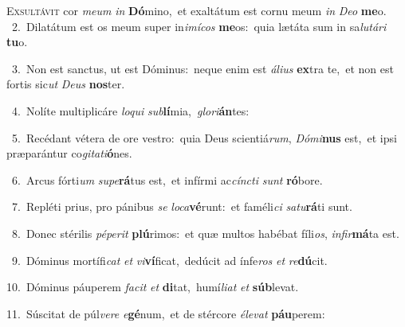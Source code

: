 \lettrine{\initial\textcolor{\initialcolor}{E}}{xsultávit} cor \textit{me}\-\textit{um} \textit{in} \textbf{Dó}\-mino,~\star et exaltátum est cornu meum \textit{in} \textit{De}\-\textit{o} \textbf{me}\-o.\\
{\numbfont\textcolor{\numbcolor}{~2.}}~Dilatátum est os meum super in\-\textit{i}\-\textit{mí}\textit{cos} \textbf{me}\-os:~\star quia lætáta sum in sa\-\textit{lu}\-\textit{tá}\textit{ri} \textbf{tu}\-o.\par
{\numbfont\textcolor{\numbcolor}{~3.}}~Non est sanctus, ut est Dóminus:~\dagger neque enim est \textit{á}\-\textit{li}\textit{us} \textbf{ex}\-tra te,~\star et non est fortis sic\textit{ut} \textit{De}\-\textit{us} \textbf{nos}\-ter.\par
{\numbfont\textcolor{\numbcolor}{~4.}}~Nolíte multiplicáre \textit{lo}\-\textit{qui} \textit{sub}\-\textbf{lí}mia,~\star \textit{glo}\-\textit{ri}\textbf{án}tes:\par
{\numbfont\textcolor{\numbcolor}{~5.}}~Recédant vétera de ore vestro:~\dagger quia Deus scientiá\-\textit{rum}\-, \textit{Dó}\-\textit{mi}\textbf{nus} est,~\star et ipsi præparántur co\-\textit{gi}\-\textit{ta}\textit{ti}\textbf{ó}nes.\par
{\numbfont\textcolor{\numbcolor}{~6.}}~Arcus fórti\textit{um} \textit{su}\-\textit{pe}\textbf{rá}tus est,~\star et infírmi ac\-\textit{cínc}\-\textit{ti} \textit{sunt} \textbf{ró}\-bore.\par
{\numbfont\textcolor{\numbcolor}{~7.}}~Repléti prius, pro pánibus \textit{se} \textit{lo}\-\textit{ca}\textbf{vé}runt:~\star et faméli\textit{ci} \textit{sa}\-\textit{tu}\textbf{rá}ti sunt.\par
{\numbfont\textcolor{\numbcolor}{~8.}}~Donec stérilis \textit{pé}\-\textit{pe}\textit{rit} \textbf{plú}\-rimos:~\star et quæ multos habébat fíli\-\textit{os}\-, \textit{in}\-\textit{fir}\textbf{má}ta est.\par
{\numbfont\textcolor{\numbcolor}{~9.}}~Dóminus mortífi\textit{cat} \textit{et} \textit{vi}\-\textbf{ví}ficat,~\star dedúcit ad ínfe\textit{ros} \textit{et} \textit{re}\-\textbf{dú}cit.\par
{\numbfont\textcolor{\numbcolor}{10.}}~Dóminus páuperem \textit{fa}\-\textit{cit} \textit{et} \textbf{di}\-tat,~\star humí\-\textit{li}\-\textit{at} \textit{et} \textbf{súb}\-levat.\par
{\numbfont\textcolor{\numbcolor}{11.}}~Súscitat de púl\-\textit{ve}\-\textit{re} \textit{e}\-\textbf{gé}num,~\star et de stércore \textit{é}\-\textit{le}\textit{vat} \textbf{páu}\-perem:\par
